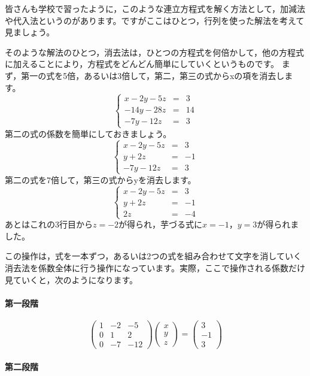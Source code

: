 \documentclass{ltjsbook}
\begin{document}
皆さんも学校で習ったように，このような連立方程式を解く方法として，加減法や代入法というのがあります。ですがここはひとつ，行列を使った解法を考えて見ましょう。

そのような解法のひとつ，消去法は，ひとつの方程式を何倍かして，他の方程式に加えることにより，方程式をどんどん簡単にしていくというものです。
まず，第一の式を5倍，あるいは3倍して，第二，第三の式からxの項を消去します。
	\[ \left \{
					\begin{array}{rcl}
					x-2y-5z&=&3\\
					-14y-28z&=&14\\
					-7y-12z&=&3
					\end{array}
					\right .
		 \]
第二の式の係数を簡単にしておきましょう。
	\[ \left \{
					\begin{array}{rcl}
					x-2y-5z&=&3\\
					y+2z&=&-1\\
					-7y-12z&=&3
					\end{array}
					\right .
		 \]
第二の式を7倍して，第三の式からyを消去します。
	\[ \left \{
					\begin{array}{rcl}
					x-2y-5z&=&3\\
					y+2z&=&-1\\
					2z&=&-4
					\end{array}
					\right .
		 \]
あとはこれの3行目から$z=-2$が得られ，芋づる式に$x=-1$，$y=3$が得られました。


この操作は，式を一本ずつ，あるいは2つの式を組み合わせて文字を消していく消去法を係数全体に行う操作になっています。実際，ここで操作される係数だけ見ていくと，次のようになります。

\paragraph{第一段階}
\[
\begin{pmatrix} 1 & -2 & -5 \\
				0 &  1 &  2 \\
				0 & -7 & -12 \end{pmatrix}
\begin{pmatrix} x \\ y \\ z \end{pmatrix}
=
\begin{pmatrix} 3 \\ -1 \\ 3 \end{pmatrix}
\]

\paragraph{第二段階}
\end{document}
